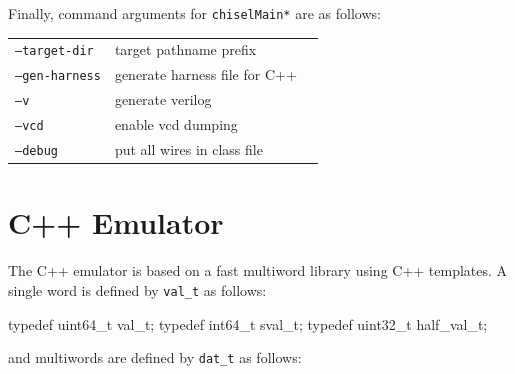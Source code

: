 \documentclass[10pt,twocolumn]{article}
\def\code#1{{\small\tt #1}}
\begin{document}
Finally, command arguments for \code{chiselMain*} are as follows: \\

\begin{tabular}{lll}
\code{--target-dir} & target pathname prefix \\
\code{--gen-harness} & generate harness file for C++ \\
\code{--v} & generate verilog \\
\code{--vcd} & enable vcd dumping \\
\code{--debug} & put all wires in class file \\
\end{tabular}


\section{C++ Emulator}

The C++ emulator is based on a fast multiword library using
C++ templates.  
A single word is defined by \code{val\_t} as follows: 

\begin{cpp}
typedef uint64_t val_t;
typedef int64_t sval_t; 
typedef uint32_t half_val_t;
\end{cpp}

\noindent
and multiwords are defined by \code{dat\_t} as follows:
\end{document}
